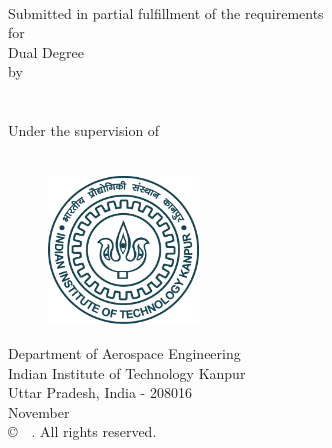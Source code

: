 \thispagestyle{empty}
\vspace*{0.50cm}
\begin{center}
 {\LARGE  {\textbf{\thesistitle}}\\}

\vspace*{1.50cm}
{ Submitted in partial fulfillment of the requirements
\\
for
}\\

\vspace*{1.0cm}
{\Large { Dual Degree}}\\

\vspace*{1.0cm}
{by}\\

\vspace*{1.0cm}
{\Large{\textbf{\authorname}}}\\
\vspace{0.3cm}
{\textbf{\authorrollno}}\\

\vspace*{1cm}
{ Under the supervision of }\\

\vspace*{0.3cm}
{\large{ \supervisorname}}\\

\vspace*{0.50cm}

\begin{figure}[h]
\centering
  \includegraphics[width=4cm,height=4cm]{HeadTail/IIT_Kanpur_Logo.png}
\end{figure}

\vspace*{0.50cm}
{ Department of Aerospace Engineering\\
Indian Institute of Technology Kanpur \\
Uttar Pradesh, India - 208016 \\
November ~\the\year}\\
\vspace{1.8cm}
\copyright~\the\year ~\authorname.  All rights reserved.
\end{center}

\clearpage

\thispagestyle{plain}
\clearpage
